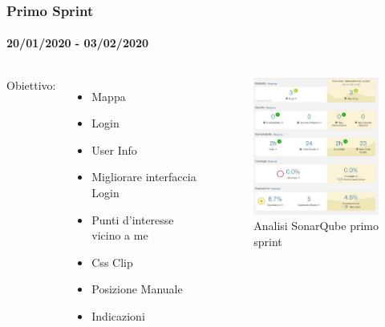 \documentclass{beamer}
\begin{document}
\begin{frame}
\frametitle{Primo Sprint}
\framesubtitle{20/01/2020 - 03/02/2020}
\begin{columns}
Obiettivo: 
  \begin{itemize}
	\item Mappa
	\item Login
	\item User Info
	\item Migliorare interfaccia Login
	\item Punti d'interesse vicino a me
	\item Css Clip
	\item Posizione Manuale
	\item Indicazioni
  \end{itemize}
  \centering  
  \begin{figure}[h]
        \includegraphics[width=5cm]{Images/SonarQube/primo-sprint.png}
        \caption{Analisi SonarQube primo sprint}
   \end{figure}
\end{columns}
\end{frame}
\end{document}
